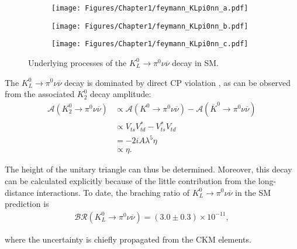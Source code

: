 \begin{figure}[h]
%
\begin{subfigure}{.333\textwidth}
  \centering
  \texttt{[image: Figures/Chapter1/feymann\_KLpi0nn\_a.pdf]}
  \end{subfigure}%
%
\begin{subfigure}{.333\textwidth}
  \centering
  \texttt{[image: Figures/Chapter1/feymann\_KLpi0nn\_b.pdf]}
  \end{subfigure}%
%
\begin{subfigure}{.333\textwidth}
  \centering
  \texttt{[image: Figures/Chapter1/feymann\_KLpi0nn\_c.pdf]}
  \end{subfigure}%
  
  \captionsetup{width=.99\linewidth}
  \caption{Underlying processes of the $K_L^0\to\pi^0\nu\overline{\nu}$ decay in SM.}
  \label{fig:KLpi0nn_feymann}
\end{figure}

%
The ${K_L^0\to\pi^0\nu\overline{\nu}}$ decay is dominated by direct CP violation \parencite{KLpi0nn_directCP}, as can be observed from the associated ${K_2^0}$ decay amplitude:
%
\vspace{1em}
\begin{align}
\mathcal{A}(K_2^0 \to \pi^0 \nu \overline{\nu}) 
&\propto \mathcal{A}(K^0 \to \pi^0 \nu \overline{\nu}) - \mathcal{A}(\overline{K}^0 \to \pi^0 \nu \overline{\nu}) \nonumber \\
&\propto V_{ts}V_{td}^{\ast} - V_{ts}^{\ast}V_{td} \nonumber \\
&= -2 i A \lambda^5 \eta \nonumber \\
&\propto \eta.
\end{align}

\noindent
The height of the unitary triangle can thus be determined. Moreover, this decay can be calculated explicitly because of the little contribution from the long-distance interactions. To date, the braching ratio of ${K_L^0\to\pi^0\nu\overline{\nu}}$ in the SM prediction is \parencite{KLpi0nn_SM} 
%
\vspace{1em}
\begin{align}
\mathcal{BR}({K_L^0\to\pi^0\nu\overline{\nu}}) = \left( 3.0 \pm 0.3 \right) \times 10^{-11},
\end{align}

\noindent
where the uncertainty is chiefly propagated from the CKM elements.

